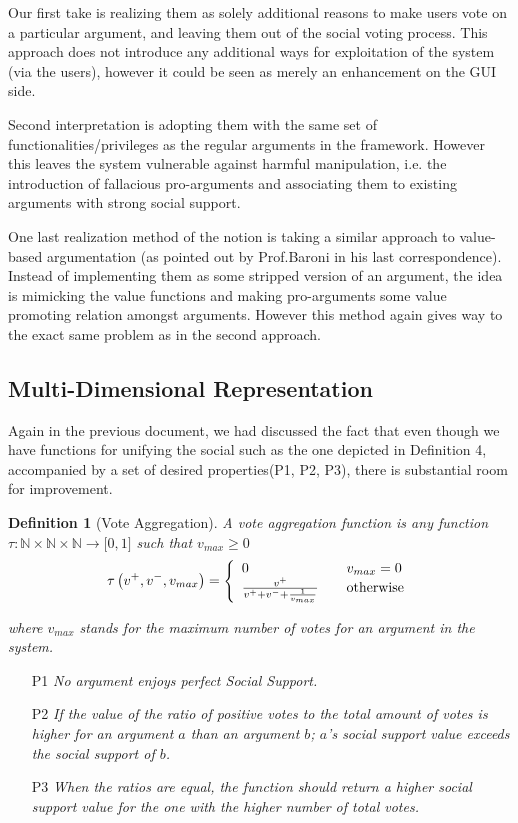 \documentclass{article}
\newtheorem{definition}{Definition}
\begin{document}
Our first take is realizing them as solely additional reasons to make users vote on a particular argument, and leaving them out of the social voting process. This approach does not introduce any additional ways for exploitation of the system (via the users), however it could be seen as merely an enhancement on the GUI side.

Second interpretation is adopting them with the same set of functionalities/privileges as the regular arguments in the framework. However this leaves the system vulnerable against harmful manipulation, i.e. the introduction of fallacious pro-arguments and associating them to existing arguments with strong social support.

 One last realization method of the notion is taking a similar approach to value-based argumentation (as pointed out by Prof.Baroni in his last correspondence). Instead of implementing them as some stripped version of an argument, the idea is mimicking the value functions and making pro-arguments some value promoting relation amongst arguments.  However this method again gives way to the exact same problem as in the second approach.


\subsection{Multi-Dimensional Representation} 

Again in the previous document, we had discussed the fact that even though we have functions for unifying the social such as the one depicted in Definition 4, accompanied by a set of desired properties(P1, P2, P3), there is substantial room for improvement. 



\begin{definition}
[Vote Aggregation]A vote aggregation function is any function
$\tau:
\mathbb{N} \times \mathbb{N} \times \mathbb{N}
\rightarrow\lbrack0,1]$ such that $v_{max}\geq0$
\[
\tau\left(  v^{+},v^{-}, v_{max}\right)  =\left\{
\begin{array}
[c]{lll}
0 &  & v_{max}=0\\
\frac{v^{+}}{v^{+}+v^{-}+\frac{1}{v_{max}}} &  & \text{otherwise}
\end{array}
\right.
\]

where $v_{max}$ stands for the maximum number of votes for an argument in the system.
\end{definition}

\begin{itemize}
\item[P1] \textit{No argument enjoys perfect Social Support.}
\item[P2] \textit{If the value of the ratio of positive votes to the total amount of votes is higher for an argument $a$ than an argument $b$; $a$'s social support value exceeds the social support of $b$.}
\item[P3] \textit{When the ratios are equal, the function should return a higher social support value for the one with the higher number of total votes.}
\end{itemize}
\end{document}

